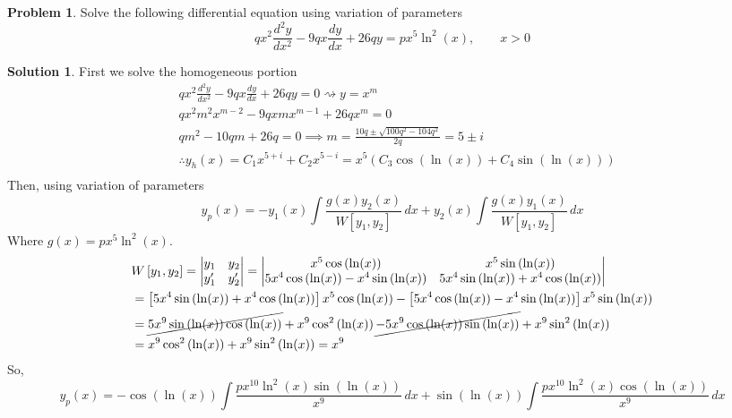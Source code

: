 \documentclass[10pt]{article}
\theoremstyle{definition}
\newtheorem{problem}{Problem}
\newtheorem{soln}{Solution}
\begin{document}
\begin{problem}
Solve the following differential equation using variation of parameters
$$qx^2\frac{d^2y}{dx^2}-9qx\frac{dy}{dx}+26qy=px^5\ln^2\left(x\right),\qquad x>0$$
\end{problem}
\begin{soln} First we solve the homogeneous portion
  \begin{align*}
     & qx^2\frac{d^2y}{dx^2}-9qx\frac{dy}{dx}+26qy=0 \rightsquigarrow y=x^m                                          \\
     & qx^2m^2x^{m-2}-9qxmx^{m-1}+26qx^m=0                                                                           \\
     & qm^2 -10qm+26q=0 \implies m=\frac{10q\pm\sqrt{100q^2-104q^2}}{2q}=5\pm i                                      \\
     & \therefore y_h(x)=C_1x^{5+i}+C_2x^{5-i}=x^5\left(C_3\cos\left(\ln(x)\right)+C_4\sin\left(\ln(x)\right)\right) \\
  \end{align*}
  Then, using variation of parameters 
  $$y_p(x)=-y_1(x)\int\frac{g(x)y_2(x)}{W\left[y_1,y_2\right]}\,dx+y_2(x)\int\frac{g(x)y_1(x)}{W\left[y_1,y_2\right]}\,dx$$
  Where $g(x)=px^5\ln^2\left(x\right)$.
  \begin{align*}
     & W\left[y_1,y_2\right]=
    \begin{vmatrix}
      y_1        & y_2          \\
      y_1^\prime & y_2^\prime 
    \end{vmatrix}
    =
    \begin{vmatrix}
      x^5\cos\left(\ln(x)\right)                             & x^5\sin\left(\ln(x)\right)                               \\
      5x^4\cos\left(\ln(x)\right)-x^4\sin\left(\ln(x)\right) & 5x^4\sin\left(\ln(x)\right)+x^4\cos\left(\ln(x)\right) 
    \end{vmatrix} \\
     & = \left[5x^4\sin\left(\ln(x)\right)+x^4\cos\left(\ln(x)\right)\right]x^5\cos\left(\ln(x)\right)
    -\left[5x^4\cos\left(\ln(x)\right)-x^4\sin\left(\ln(x)\right)\right]x^5\sin\left(\ln(x)\right)                       \\
     & = \cancel{5x^9\sin\left(\ln(x)\right)\cos\left(\ln(x)\right)}+x^9\cos^2\left(\ln(x)\right)
    \cancel{-5x^9\cos\left(\ln(x)\right)\sin\left(\ln(x)\right)} +x^9\sin^2\left(\ln(x)\right)\\
    & = x^9\cos^2\left(\ln(x)\right)+x^9\sin^2\left(\ln(x)\right) = x^9
  \end{align*}
  So,
  $$y_p(x)=-\cos\left(\ln(x)\right)\int\frac{px^{10}\ln^2\left(x\right)\sin\left(\ln(x)\right)}{x^9}\,dx+
    \sin\left(\ln(x)\right)\int\frac{px^{10}\ln^2\left(x\right)\cos\left(\ln(x)\right)}{x^9}\,dx$$
\end{soln}
\end{document}

